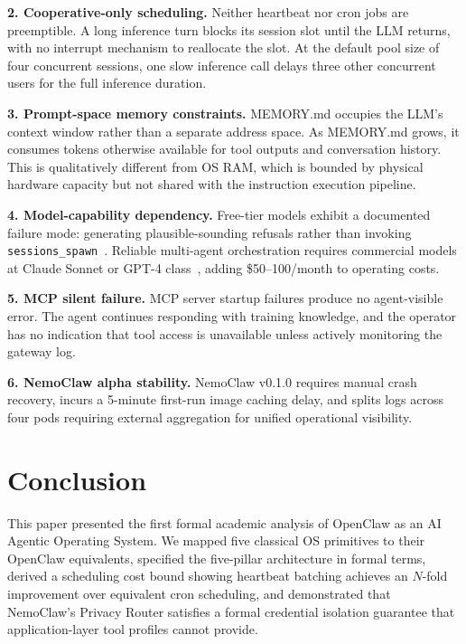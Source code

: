 \documentclass[journal]{IEEEtran}
\begin{document}
\textbf{2. Cooperative-only scheduling.} Neither heartbeat nor cron jobs are
preemptible. A long inference turn blocks its session slot until the LLM
returns, with no interrupt mechanism to reallocate the slot. At the default
pool size of four concurrent sessions, one slow inference call delays three
other concurrent users for the full inference duration.

\textbf{3. Prompt-space memory constraints.} MEMORY.md occupies the LLM's
context window rather than a separate address space. As MEMORY.md grows, it
consumes tokens otherwise available for tool outputs and conversation history.
This is qualitatively different from OS RAM, which is bounded by physical
hardware capacity but not shared with the instruction execution pipeline.

\textbf{4. Model-capability dependency.} Free-tier models exhibit a documented
failure mode: generating plausible-sounding refusals rather than invoking
\texttt{sessions\_spawn}~\cite{openclaw2024github}. Reliable multi-agent
orchestration requires commercial models at Claude Sonnet or GPT-4
class~\cite{openai2023gpt4}, adding \$50--100/month to operating costs.

\textbf{5. MCP silent failure.} MCP server startup failures produce no
agent-visible error. The agent continues responding with training knowledge,
and the operator has no indication that tool access is unavailable unless
actively monitoring the gateway log.

\textbf{6. NemoClaw alpha stability.} NemoClaw v0.1.0 requires manual crash
recovery, incurs a 5-minute first-run image caching delay, and splits logs
across four pods requiring external aggregation for unified operational
visibility.

\section{Conclusion}

This paper presented the first formal academic analysis of OpenClaw as an AI
Agentic Operating System. We mapped five classical OS primitives to their
OpenClaw equivalents, specified the five-pillar architecture in formal terms,
derived a scheduling cost bound showing heartbeat batching achieves an
$N$-fold improvement over equivalent cron scheduling, and demonstrated that
NemoClaw's Privacy Router satisfies a formal credential isolation guarantee
that application-layer tool profiles cannot provide.
\end{document}
